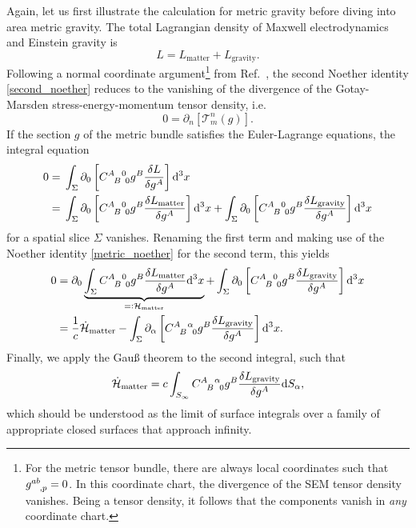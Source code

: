 Again, let us first illustrate the calculation for metric gravity before diving into area metric gravity. The total Lagrangian density of Maxwell electrodynamics and Einstein gravity is
\begin{equation}\label{metric_noether}
  L = L_\text{matter} + L_\text{gravity}.
\end{equation}
Following a normal coordinate argument\footnote{For the metric tensor bundle, there are always local coordinates such that $g^{ab}_{\hphantom{ab},p}=0$. In this coordinate chart, the divergence of the SEM tensor density vanishes. Being a tensor density, it follows that the components vanish in \emph{any} coordinate chart.} from Ref.\ \cite{Gotay_1992}, the second Noether identity \eqref{second_noether} reduces to the vanishing of the divergence of the Gotay-Marsden stress-energy-momentum tensor density, i.e.
\begin{equation}
  0 = \partial_n\left\lbrack\mathcal  T^n_m(g)\right\rbrack.
\end{equation}
If the section $g$ of the metric bundle satisfies the Euler-Lagrange equations, the integral equation
\begin{equation}
  \begin{aligned}
    0 = {} & \int_\Sigma \partial_0\left\lbrack \gmc{A}{B}{0}{0} g^B \frac{\delta L}{\delta g^A}\right\rbrack\mathrm d^3x \\
    = {} & \int_\Sigma \partial_0\left\lbrack \gmc{A}{B}{0}{0} g^B \frac{\delta L_\text{matter}}{\delta g^A}\right\rbrack\mathrm d^3x + \int_\Sigma \partial_0\left\lbrack \gmc{A}{B}{0}{0} g^B \frac{\delta L_\text{gravity}}{\delta g^A}\right\rbrack\mathrm d^3x
  \end{aligned}
\end{equation}
for a spatial slice $\Sigma$ vanishes. Renaming the first term and making use of the Noether identity \eqref{metric_noether} for the second term, this yields
\begin{equation}
  \begin{aligned}
    0 = {} & \partial_0 \underbrace{\int_\Sigma \gmc{A}{B}{0}{0} g^B \frac{\delta L_\text{matter}}{\delta g^A}\mathrm d^3x}_{=\vcentcolon \mathcal H_\text{matter}} + \int_\Sigma \partial_0\left\lbrack \gmc{A}{B}{0}{0} g^B \frac{\delta L_\text{gravity}}{\delta g^A}\right\rbrack\mathrm d^3x \\
    = {} & \frac{1}{c} \dot{\mathcal H}_\text{matter} - \int_\Sigma \partial_\alpha\left\lbrack \gmc{A}{B}{\alpha}{0} g^B \frac{\delta L_\text{gravity}}{\delta g^A}\right\rbrack\mathrm d^3x.
  \end{aligned}
\end{equation}
Finally, we apply the Gauß theorem to the second integral, such that
\begin{equation}\label{first_balance_equation}
  \dot{\mathcal H}_\text{matter} = c \int_{S_\infty} \gmc{A}{B}{\alpha}{0} g^B \frac{\delta L_\text{gravity}}{\delta g^A} \mathrm dS_\alpha,
\end{equation}
which should be understood as the limit of surface integrals over a family of appropriate closed surfaces that approach infinity.


